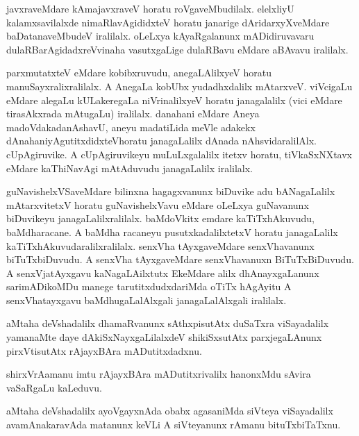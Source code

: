 \documentclass{article}
\begin{document}
\begin{mn}%
javxraveMdare kAmajavxraveV horatu roVgaveMbudilalx. elelxliyU kalamxsavilalxde 
nimaRlavAgididxteV horatu janarige dAridarxyXveMdare baDatanaveMbudeV iralilalx. oLeLxya 
kAyaRgalanunx mADidiruvavaru dulaRBarAgidadxreVvinaha vasutxgaLige dulaRBavu eMdare 
aBAvavu iralilalx.
\end{mn}

\begin{mn}%
parxmutatxteV eMdare kobibxruvudu, anegaLAlilxyeV horatu manuSayxralixralilalx. A AnegaLa 
kobUbx yudadhxdalilx mAtarxveV. viVcigaLu eMdare alegaLu kULakeregaLa niVrinalilxyeV 
horatu janagalalilx (vici eMdare tirasAkxrada mAtugaLu) iralilalx. danahani eMdare Aneya 
madoVdakadanAshavU, aneyu madatiLida meVle adakekx dAnahaniyAgutitxdidxteVhoratu 
janagaLalilx dAnada nAhsvidaralilAlx. cUpAgiruvike. A cUpAgiruvikeyu muLuLxgalalilx itetxv 
horatu, tiVkaSxNXtavx eMdare kaThiNavAgi mAtAduvudu janagaLalilx iralilalx.
\end{mn}

\begin{mn}%
guNavishelxVSaveMdare bilinxna hagagxvanunx biDuvike adu bANagaLalilx mAtarxvitetxV horatu 
guNavishelxVavu eMdare oLeLxya guNavanunx biDuvikeyu janagaLalilxralilalx. baMdoVkitx 
emdare kaTiTxhAkuvudu, baMdharacane. A baMdha racaneyu pusutxkadalilxtetxV horatu 
janagaLalilx kaTiTxhAkuvudaralilxralilalx. senxVha tAyxgaveMdare senxVhavanunx 
biTuTxbiDuvudu. A senxVha tAyxgaveMdare senxVhavanuxn BiTuTxBiDuvudu. A senxVjatAyxgavu 
kaNagaLAilxtutx EkeMdare alilx dhAnayxgaLanunx sarimADikoMDu manege tarutitxdudxdariMda 
oTiTx hAgAyitu A senxVhatayxgavu baMdhugaLalAlxgali janagaLalAlxgali iralilalx.
\end{mn}

\begin{mn}%
aMtaha deVshadalilx dhamaRvanunx sAthxpisutAtx duSaTxra viSayadalilx yamanaMte daye 
dAkiSxNayxgaLilalxdeV shikiSxsutAtx parxjegaLAnunx pirxVtisutAtx rAjayxBAra mADutitxdadxnu.
\end{mn}

\begin{mn}%
shirxVrAamanu imtu rAjayxBAra mADutitxrivalilx hanonxMdu sAvira vaSaRgaLu kaLeduvu.
\end{mn}

\begin{mn}%
aMtaha deVshadalilx ayoVgayxnAda obabx agasaniMda siVteya viSayadalilx avamAnakaravAda 
matanunx keVLi A siVteyanunx rAmanu bituTxbiTaTxnu.
\end{mn}
\end{document}
